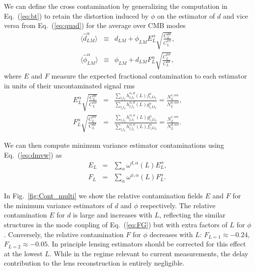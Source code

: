 \documentclass[prd,amsmath,amssymb,floatfix,superscriptaddress,nofootinbib,twocolumn]{revtex4-1}
\def\bea{\begin{eqnarray}}
\def\eea{\end{eqnarray}}
\newcommand{\ec}[1]{Eq.~(\ref{eq:#1})}
\newcommand{\rf}[1]{\ref{fig:#1}}
\begin{document}
 
 
 We can define the cross contamination by generalizing the computation in \ec{bt} to retain the distortion induced by $\phi$ on the estimator of $d$ and vice
 versa from \ec{quad} for the average over CMB modes
 \bea
 \langle \hat{d}^{\alpha}_{LM} \rangle &\equiv& d_{LM} +\phi_{LM}E_{L}^{\alpha}\sqrt{\frac{C_L^{dd}}{C_L^{\phi\phi}}}, \nonumber\\
 \langle \hat{\phi}^{\alpha}_{LM} \rangle &\equiv& \phi_{LM} +d_{LM}F_{L}^{\alpha}\sqrt{\frac{C_L^{\phi\phi}}{C_L^{dd}}},
\eea
where $E$ and $F$ measure the expected fractional contamination to each estimator in units of their uncontaminated signal rms
\bea
E^{\alpha}_{L}  \sqrt{\frac{C_{L}^{dd}}{C_{L}^{\phi\phi}}}  &=&\frac{\sum_{l_{1}l_{2}}h_{l_{1}l_{2}}^{\alpha,d}(L)f_{l_{1}Ll_{2}}^{\alpha}}{\sum_{l_{1}l_{2}}h_{l_{1}l_{2}}^{\alpha,d}(L)g_{l_{1}Ll_{2}}^{\alpha}} =\frac{N_{L}^{c,\alpha\alpha}}{N_{L}^{\phi,\alpha\alpha}},\nonumber\\
F^{\alpha}_{L} \sqrt{\frac{C_{L}^{\phi\phi}}{C_{L}^{dd}}}  &=&\frac{\sum_{l_{1}l_{2}}h_{l_{1}l_{2}}^{\alpha,\phi}(L)g_{l_{1}Ll_{2}}^{\alpha}}{\sum_{l_{1}l_{2}}h_{l_{1}l_{2}}^{\alpha,\phi}(L)f_{l_{1}Ll_{2}}^{\alpha}} =\frac{N_{L}^{c,\alpha\alpha}}{N_{L}^{d,\alpha\alpha}}.
\eea

 
We can then compute minimum variance estimator contaminations using \ec{dmvw} as
\bea
E_{L} &=&  
\sum_{\alpha}\omega^{d,\alpha}(L)  E^{\alpha}_{L} , \nonumber\\
F_{L} &=&\sum_{\alpha}\omega^{\phi,\alpha}(L) F^{\alpha}_{L} .
\eea

 
 In Fig.~\rf{Cont_multi} we show the relative contamination fields $E$ and $F$ for the minimum 
 variance estimators of $d$ and $\phi$ respectively.   The relative contamination $E$ for
 $d$ is large and increases with $L$, reflecting the similar structures in the
 mode coupling  of \ec{FG} but with extra factors of $L$ for $\phi$. 
 Conversely, the relative contamination $F$ for $\phi$ decreases with $L$: $F_{L=1} \approx -0.24$,  $F_{L=2} \approx -0.05$.  In principle lensing estimators 
 should be corrected for this effect at the lowest $L$. 
   While in the regime relevant to current 
 measurements, the delay contribution to the lens reconstruction is entirely negligible.
 
 
 
\end{document}
